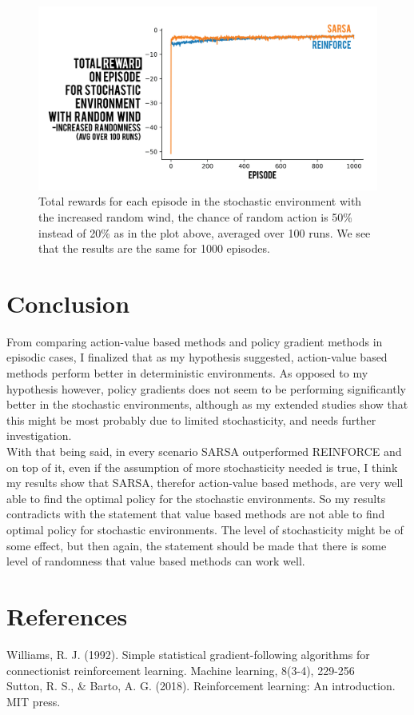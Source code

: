 \documentclass[10pt, letterpaper, twocolumn]{article}
\begin{document}
	\begin{figure}[H]
		\centering
		\includegraphics[width=\linewidth]{figure_wind_increased}
		\caption{\small Total rewards for each episode in the stochastic environment with the increased random wind, the chance of random action is 50\% instead of 20\% as in the plot above, averaged over 100 runs. We see that the results are the same for 1000 episodes.}
		\label{fig:wind_50}
	\end{figure}
	
	\section{Conclusion}
	
	From comparing action-value based methods and policy gradient methods in episodic cases, I finalized that as my hypothesis suggested, action-value based methods perform better in deterministic environments. As opposed to my hypothesis however, policy gradients does not seem to be performing significantly better in the stochastic environments, although as my extended studies show that this might be most probably due to limited stochasticity, and needs further investigation. \\
	
	With that being said, in every scenario SARSA outperformed REINFORCE and on top of it, even if the assumption of more stochasticity needed is true, I think my results show that SARSA, therefor action-value based methods, are very well able to find the optimal policy for the stochastic environments. So my results contradicts with the statement that value based methods are not able to find optimal policy for stochastic environments. The level of stochasticity might be of some effect, but then again, the statement should be made that there is some level of randomness that value based methods can work well.
	
	\section{References}
	
	\noindent Williams, R. J. (1992). Simple statistical gradient-following algorithms for connectionist reinforcement learning. Machine learning, 8(3-4), 229-256\\
	
	\noindent Sutton, R. S., \& Barto, A. G. (2018). Reinforcement learning: An introduction. MIT press.
	
	
	
\end{document}
